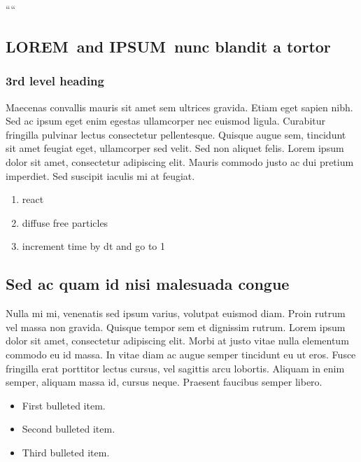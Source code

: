 \documentclass[
  10pt,
  letterpaper,
]{article}
\begin{document}
````

\subsection{\texorpdfstring{\textbf{LOREM}~and \textbf{IPSUM}~nunc
blandit a
tortor}{LOREM~and IPSUM~nunc blandit a tortor}}\label{lorem-and-ipsum-nunc-blandit-a-tortor}

\subsubsection{3rd level heading}\label{rd-level-heading}

Maecenas convallis mauris sit amet sem ultrices gravida. Etiam eget
sapien nibh. Sed ac ipsum eget enim egestas ullamcorper nec euismod
ligula. Curabitur fringilla pulvinar lectus consectetur pellentesque.
Quisque augue sem, tincidunt sit amet feugiat eget, ullamcorper sed
velit. Sed non aliquet felis. Lorem ipsum dolor sit amet, consectetur
adipiscing elit. Mauris commodo justo ac dui pretium imperdiet. Sed
suscipit iaculis mi at feugiat.

\begin{enumerate}
\def\labelenumi{\arabic{enumi}.}
\item
  react
\item
  diffuse free particles
\item
  increment time by dt and go to 1
\end{enumerate}

\subsection{Sed ac quam id nisi malesuada
congue}\label{sed-ac-quam-id-nisi-malesuada-congue}

Nulla mi mi, venenatis sed ipsum varius, volutpat euismod diam. Proin
rutrum vel massa non gravida. Quisque tempor sem et dignissim rutrum.
Lorem ipsum dolor sit amet, consectetur adipiscing elit. Morbi at justo
vitae nulla elementum commodo eu id massa. In vitae diam ac augue semper
tincidunt eu ut eros. Fusce fringilla erat porttitor lectus cursus, vel
sagittis arcu lobortis. Aliquam in enim semper, aliquam massa id, cursus
neque. Praesent faucibus semper libero.

\begin{itemize}
\item
  First bulleted item.
\item
  Second bulleted item.
\item
  Third bulleted item.
\end{itemize}
\end{document}
